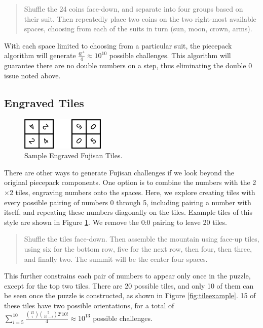 \documentclass[10pt,journal,compsoc]{IEEEtran}
\begin{document}
\begin{quote}
    
  Shuffle the 24 coins face-down, and separate into four groups based on their suit. Then repeatedly place two coins on the two right-most available spaces, choosing from each of the suits in turn (sun, moon, crown, arms).
\end{quote}


With each space limited to choosing from a particular suit, the piecepack algorithm will generate $\frac{6!^4}{4} \approx 10^{10}$ possible challenges. 
This algorithm will guarantee there are no double numbers on a step, thus eliminating the double 0 issue noted above. 

\subsection{Engraved Tiles}

\begin{figure}[t]
\centering
\includegraphics[width=4cm]{graphics/engravedsample.png}
\caption{Sample Engraved Fujisan Tiles.}
\label{fig:engravedsample}
\end{figure}


There are other ways to generate Fujisan challenges if we look beyond the original piecepack components. One option is to combine the numbers with the 2$\times$2 tiles, engraving
numbers onto the spaces. Here, we explore creating tiles with every possible pairing of numbers 0 through 5, including pairing a number with itself, and repeating these numbers diagonally on the tiles. Example tiles of this style are shown in Figure \ref{fig:engravedsample}. We remove the 0:0 pairing to leave 20 tiles. 

\begin{quote}
    
  Shuffle the tiles face-down. Then assemble the mountain using face-up tiles, using six for the bottom row, five for the next row, then four, then three, and finally two. The summit will be the center four spaces.
\end{quote}

This further constrains each pair of numbers to appear only once in the puzzle, except for the top two tiles. There are 20 possible tiles, and only 10 of them can be seen once the puzzle is constructed, as shown in Figure \ref{fig:tileexample}. 15 of these tiles have two possible orientations, for a total of $\sum_{i = 5}^{10}\frac{{15 \choose i}\binom{5}{10 - i}2^{i}10!}{4} \approx 10^{13}
$ possible challenges.
\end{document}
